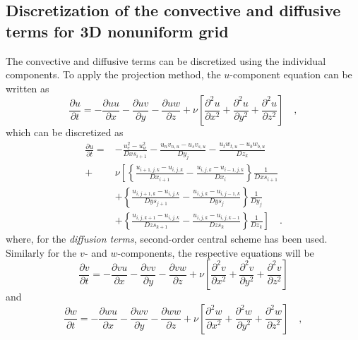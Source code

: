 \documentclass[12pt,a4paper,fleqn]{article}
\begin{document}
\subsection{Discretization of the convective and diffusive terms for 3D nonuniform grid}
The convective and diffusive terms can be discretized using the individual components. To apply the projection method, the $u$-component equation can be written as
\begin{equation} \label{eq:3D-convective-diffusive-u}
\frac{\partial u}{\partial t} = -\frac{\partial uu}{\partial x} -\frac{\partial uv}{\partial y} -\frac{\partial uw}{\partial z} + \nu\left[\frac{\partial^2u}{\partial x^2} + \frac{\partial^2u}{\partial y^2} + \frac{\partial^2u}{\partial z^2}\right] \quad,
\end{equation}
which can be discretized as
\begin{align}\label{eq:3D-discretized_convective-diffusive-u}
\frac{\partial u}{\partial t} =
{}& - \frac{u_e^2 - u_w^2}{Dxs_{i+1}}
- \frac{u_n v_{n,u} - u_s v_{s,u}}{Dy_j}
- \frac{u_t w_{t,u} - u_b w_{b,u}}{Dz_k}
\nonumber\\
+ & \nu\left[
\left\{
\frac{u_{i+1,j,k}-u_{i,j,k}}{Dx_{i+1}}
- \frac{u_{i,j,k}-u_{i-1,j,k}}{Dx_i}
\right\}
\frac{1}{Dxs_{i+1}}
\right.\nonumber\\
& + \left\{
\frac{u_{i,j+1,k}-u_{i,j,k}}{Dys_{j+1}}
- \frac{u_{i,j,k}-u_{i,j-1,k}}{Dys_j}
\right\}
\frac{1}{Dy_j}\nonumber\\
& \left. + \left\{
\frac{u_{i,j,k+1}-u_{i,j,k}}{Dzs_{k+1}}
- \frac{u_{i,j,k}-u_{i,j,k-1}}{Dzs_k}
\right\}
\frac{1}{Dz_k}
\right] \quad .
\end{align}
where, for the \emph{diffusion terms}, second-order central scheme has been used. Similarly for the \(v\)- and \(w\)-components, the respective equations will be
\begin{equation} \label{eq:3D-convective-diffusive-v}
\frac{\partial v}{\partial t} = -\frac{\partial vu}{\partial x} -\frac{\partial vv}{\partial y} -\frac{\partial vw}{\partial z} + \nu\left[\frac{\partial^2v}{\partial x^2} + \frac{\partial^2v}{\partial y^2} + \frac{\partial^2v}{\partial z^2}\right]
\end{equation}
and 
\begin{equation} \label{eq:3D-convective-diffusive-w}
\frac{\partial w}{\partial t} = -\frac{\partial wu}{\partial x} -\frac{\partial wv}{\partial y} -\frac{\partial ww}{\partial z} + \nu\left[\frac{\partial^2w}{\partial x^2} + \frac{\partial^2w}{\partial y^2} + \frac{\partial^2w}{\partial z^2}\right] \quad,
\end{equation}
\end{document}
